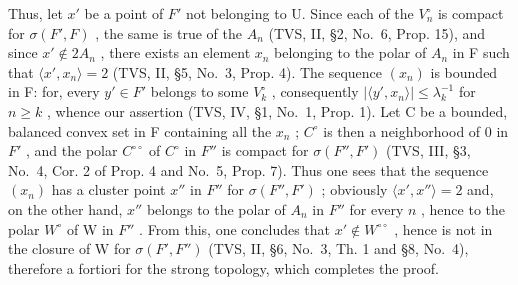 Thus, let \(x'\) be a point of \(F'\) not belonging to U. Since each of the \(V_n^\circ\) is compact for \(\sigma(F', F)\) , the same is true of the \(A_n\) (TVS, II, §2, No.~6, Prop. 15), and since \(x' \notin 2A_n\) , there exists an element \(x_n\) belonging to the polar of \(A_n\) in F such that \(\langle x', x_n \rangle = 2\) (TVS, II, §5, No.~3, Prop. 4). The sequence \((x_n)\) is bounded in F: for, every \(y' \in F'\) belongs to some \(V_k^\circ\) , consequently \(|\langle y', x_n \rangle| \leqslant \lambda_k^{-1}\) for \(n \geqslant k\) , whence our assertion (TVS, IV, §1, No.~1, Prop. 1). Let C be a bounded, balanced convex set in F containing all the \(x_n\) ; \(C^\circ\) is then a neighborhood of 0 in \(F'\) , and the polar \(C^{\circ\circ}\) of \(C^\circ\) in \(F''\) is compact for \(\sigma(F'', F')\) (TVS, III, §3, No.~4, Cor. 2 of Prop. 4 and No.~5, Prop. 7). Thus one sees that the sequence \((x_n)\) has a cluster point \(x''\) in \(F''\) for \(\sigma(F'', F')\) ; obviously \(\langle x', x'' \rangle = 2\) and, on the other hand, \(x''\) belongs to the polar of \(A_n\) in \(F''\) for every \(n\) , hence to the polar \(W^\circ\) of W in \(F''\) . From this, one concludes that \(x' \notin W^{\circ\circ}\) , hence is not in the closure of W for \(\sigma(F', F'')\) (TVS, II, §6, No.~3, Th. 1 and §8, No.~4), therefore a fortiori for the strong topology, which completes the proof.
\relax{}
